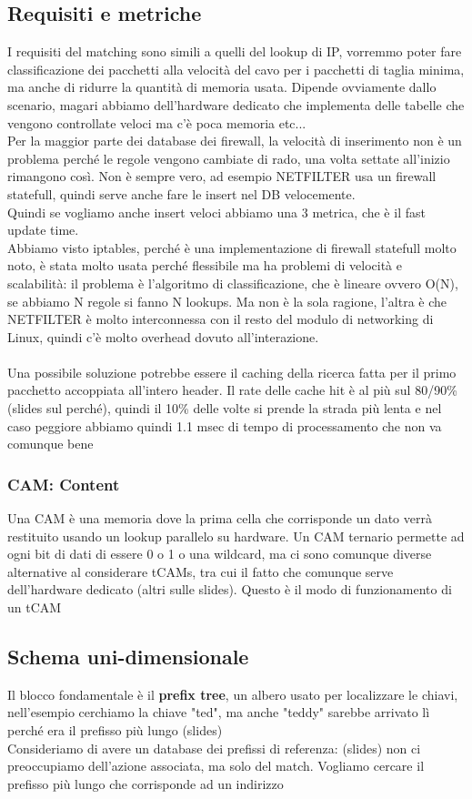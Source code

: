 \documentclass[12pt, oneside]{extbook} %
\begin{document}
\subsection{Requisiti e metriche}
I requisiti del matching sono simili a quelli del lookup di IP, vorremmo poter fare classificazione dei pacchetti alla velocità del cavo per i pacchetti di taglia minima, ma anche di ridurre la quantità di memoria usata. Dipende ovviamente dallo scenario, magari abbiamo dell'hardware dedicato che implementa delle tabelle che vengono controllate veloci ma c'è poca memoria etc...\\ Per la maggior parte dei database dei firewall, la velocità di inserimento non è un problema perché le regole vengono cambiate di rado, una volta settate all'inizio rimangono così. Non è sempre vero, ad esempio NETFILTER usa un firewall statefull, quindi serve anche fare le insert nel DB velocemente.\\ Quindi se vogliamo anche insert veloci abbiamo una 3 metrica, che è il fast update time.\\ Abbiamo visto iptables, perché è una implementazione di firewall statefull molto noto, è stata molto usata perché flessibile ma ha problemi di velocità e scalabilità: il problema è l'algoritmo di classificazione, che è lineare ovvero O(N), se abbiamo N regole si fanno N lookups. Ma non è la sola ragione, l'altra è che NETFILTER è molto interconnessa con il resto del modulo di networking di Linux, quindi c'è molto overhead dovuto all'interazione. \\\\
Una possibile soluzione potrebbe essere il caching della ricerca fatta per il primo pacchetto accoppiata all'intero header. Il rate delle cache hit è al più sul 80/90\% (slides sul perché), quindi il 10\% delle volte si prende la strada più lenta e nel caso peggiore abbiamo quindi 1.1 msec di tempo di processamento che non va comunque bene
\subsubsection{CAM: Content}
Una CAM è una memoria dove la prima cella che corrisponde un dato verrà restituito usando un lookup parallelo su hardware. Un CAM ternario permette ad ogni bit di dati di essere 0 o 1 o una wildcard, ma ci sono comunque diverse alternative al considerare tCAMs, tra cui il fatto che comunque serve dell'hardware dedicato (altri sulle slides).
Questo è il modo di funzionamento di un tCAM
\subsection{Schema uni-dimensionale}
Il blocco fondamentale è il \textbf{prefix tree}, un albero usato per localizzare le chiavi, nell'esempio cerchiamo la chiave "ted", ma anche "teddy" sarebbe arrivato lì perché era il prefisso più lungo
(slides)\\ Consideriamo di avere un database dei prefissi di referenza:
(slides)
non ci preoccupiamo dell'azione associata, ma solo del match. Vogliamo cercare il prefisso più lungo che corrisponde ad un indirizzo
\end{document}
